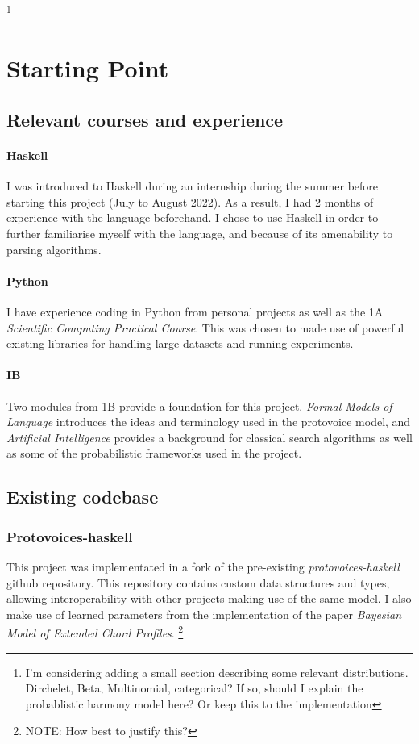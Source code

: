 \documentclass[12pt,a4paper,twoside,openright]{report}
\theoremstyle{definition}
\begin{document}
\footnote{I'm considering adding a small section describing some relevant distributions. Dirchelet, Beta, Multinomial, categorical? If so, should I explain the probablistic harmony model here? Or keep this to the implementation}
\section{Starting Point}

\subsection{Relevant courses and experience}

\paragraph{Haskell}{I was introduced to Haskell during an internship during the summer before starting this project (July to August 2022). As a result, I had 2 months of experience with the language beforehand. I chose to use Haskell in order to further familiarise myself with the language, and because of its amenability to parsing algorithms.}

\paragraph{Python}{I have experience coding in Python from personal projects as well as the 1A \textit{Scientific Computing Practical Course}. This was chosen to made use of powerful existing libraries for handling large datasets and running experiments. }

\paragraph{IB}{ Two modules from 1B provide a foundation for this project. \textit{Formal Models of Language} introduces the ideas and terminology used in the protovoice model, and \textit{Artificial Intelligence} provides a background for classical search algorithms as well as some of the probabilistic frameworks used in the project.}

\subsection{Existing codebase}
\subsubsection{Protovoices-haskell}
This project was implementated in a fork of the pre-existing \textit{protovoices-haskell} github repository. This repository contains custom data structures and types, allowing interoperability with other projects making use of the same model. I also make use of learned parameters from the implementation of the paper \textit{Bayesian Model of Extended Chord Profiles}\cite{finkensiepChordTypesOrnamentation2023}. 
\footnote{NOTE: How best to justify this?}
\end{document}
